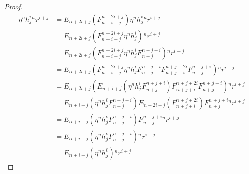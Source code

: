 \documentclass[11pt]{article}
\theoremstyle{plain}
\theoremstyle{definition}
\newcommand{\des}[1]{\marginpar{\tiny \textcolor{purple}{DJC: #1}}}
\begin{document}
\begin{proof}
	\begin{align}
		 \eta {}^nh^i_j{}^n r^{i+j} &=E_{n+2i+j}(F^{n+2i+j}_{n+i+j}) \eta {}^nh^i_j{}^n r^{i+j} \\
									&=E_{n+2i+j}(F^{n+2i+j}_{n+i+j} \eta {}^nh^i_j) {}^n r^{i+j} \\
									&= E_{n+2i+j}(F^{n+2i+j}_{n+i+j} \eta {}^nh^i_jF^{n+j+i}_{n+j}) {}^nr^{i+j} \\
									&= E_{n+2i+j}(F^{n+2i+j}_{n+i+j} \eta {}^nh^i_jF^{n+j+i}_{n+j}F^{n+j+2i}_{n+j+i}F^{n+j+i}_{n+j}) {}^nr^{i+j} \\
									&= E_{n+2i+j}(E_{n+i+j}( \eta {}^nh^i_jF^{n+j+i}_{n+j})F^{n+j+2i}_{n+j+i}F^{n+j+i}_{n+j}) {}^nr^{i+j} \\
									&=E_{n+i+j}( \eta {}^nh^i_j F^{n+j+i}_{n+j})E_{n+2i+j}(F^{n+j+2i}_{n+j+i})F^{n+j+i}_{n+j} {}^nr^{i+j} \\
									&= E_{n+i+j}( \eta {}^nh^i_jF^{n+j+i}_{n+j})F^{n+j+i}_{n+j}{}^n r^{i+j} \\
									&= E_{n+i+j}( \eta {}^nh^i_jF^{n+j+i}_{n+j}){}^nr^{i+j} \\
									&= E_{n+i+j}( \eta {}^nh^i_j){}^nr^{i+j} \
	\end{align}
\end{proof}
\des{I think I was actually correct about all factors of d for this proof}
\end{document}
